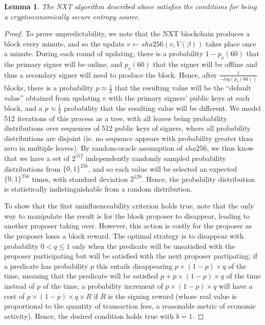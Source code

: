 \documentclass[11pt,a4paper]{report}
\theoremstyle{plain}
\newtheorem{lem}[thm]{Lemma}
\theoremstyle{definition}
\theoremstyle{remark}
\begin{document}
\begin{lem}
The NXT algorithm described above satisfies the conditions for being a cryptoeconomically secure entropy source.
\end{lem}
\begin{proof}
To prove unpredictability, we note that the NXT blockchain produces a block every minute, and so the update $v \leftarrow sha256(v, V(\beta))$ takes place once a minute. During each round of updating, there is a probability $1 - p_o(60)$ that the primary signer will be online, and $p_o(60)$ that the signer will be offline and thus a secondary signer will need to produce the block. Hence, after $\frac{1}{-log(p_o(60))}$ blocks, there is a probability $p \approx \frac{1}{2}$ that the resulting value will be the ``default value'' obtained from updating $v$ with the primary signers' public keys at each block, and a $p \approx \frac{1}{2}$ probability that the resulting value will be different. We model 512 iterations of this process as a tree, with all leaves being probability distributions over sequences of 512 public keys of signers, where all probability distributions are disjoint (ie. no sequence appears with probability greater than zero in multiple leaves). By random-oracle assumption of $sha256$, we thus know that we have a set of $2^{512}$ independently randomly sampled probability distributions from $\{0,1\}^{256}$, and so each value will be selected an expected $\{0,1\}^{256}$ times, with standard deviation $2^{128}$. Hence, the probability distribution is statistically indistinguishable from a random distribution.
 
To show that the first uninfluenceability criterion holds true, note that the only way to manipulate the result is for the block proposer to disappear, leading to another proposer taking over. However, this action is costly for the proposer as the proposer loses a block reward. The optimal strategy is to disappear with probability $0 < q \leq 1$ only when the predicate will be unsatisfied with the proposer participating but will be satisfied with the next proposer partipating; if a predicate has probability $p$ this entails disappearing $p \times  (1-p) \times  q$ of the time, meaning that the predicate will be satisfied $p + p \times  (1-p) \times  q$ of the time instead of $p$ of the time, a probability increment of $p \times  (1-p) \times  q$ will have a cost of $p \times  (1-p) \times  q \times  R$ if $R$ is the signing reward (whose real value is proportional to the quantity of transaction fees, a reasonable metric of economic activity). Hence, the desired condition holds true with $b = 1$.


\end{proof}
\end{document}
